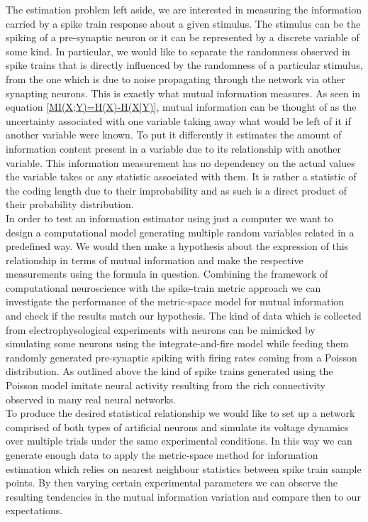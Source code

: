 \documentclass[12pt]{extarticle}
\begin{document}
\noindent
The estimation problem left aside, we are interested in measuring the information 
carried by a spike train response about a given stimulus. The stimulus can be the
spiking of a pre-synaptic neuron or it can be represented by a discrete variable
of some kind. In particular, we would like to separate the randomness observed in
spike trains that is directly influenced by the randomness of a particular stimulus, 
from the one which is due to noise propagating through the network via other synapting
neurons. This is exactly what mutual information measures. As seen in equation
\ref{MI(X;Y)=H(X)-H(X|Y)}, mutual information can be thought of as the uncertainty
associated with one variable taking away what would be left of it if another variable
were known. To put it differently it estimates the amount of information content present
in a variable due to its relationship with another variable. This information
measurement has no dependency on the actual values the variable takes or any statistic
associated with them. It is rather a statistic of the coding length due to their
improbability and as such is a direct product of their probability distribution.\\ 

\noindent
In order to test an information estimator using just a computer we want to design a
computational model generating multiple random variables related in a predefined way. We 
would then make a hypothesis about the expression of this relationship in terms of
mutual information and make the respective measurements using the formula in question.
Combining the framework of computational neuroscience with the spike-train metric
approach we can investigate the performance of the metric-space model for mutual
information and check if the results match our hypothesis. The kind of data which is
collected from electrophysological experiments with neurons can be mimicked by
simulating some neurons using the integrate-and-fire model while feeding them
randomly generated pre-synaptic spiking with firing rates coming from a Poisson
distribution. As outlined above the kind of spike trains generated using the Poisson
model imitate neural activity resulting from the rich connectivity observed in many 
real neural networks.\\

\noindent
To produce the desired statistical relationship we would like to set up a network 
comprised of both types of artificial neurons and simulate its voltage dynamics over 
multiple trials under the same experimental conditions. In this way we can generate
enough data to apply the metric-space method for information estimation which relies on
nearest neighbour statistics between spike train sample points. By then varying certain
experimental parameters we can observe the resulting tendencies in the mutual
information variation and compare then to our expectations.
\end{document}
